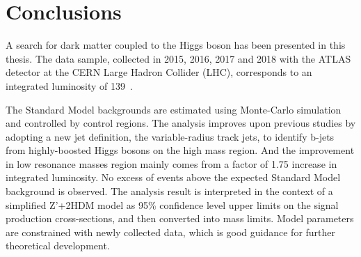 \chapter{Conclusions}

\label{ch:con}

\par A search for dark matter coupled to the Higgs boson has been presented in this thesis. 
The data sample, collected in 2015, 2016, 2017 and 2018 with the ATLAS detector at the CERN Large Hadron Collider (LHC), corresponds to an integrated luminosity of 139~\ifb. 

\par The Standard Model backgrounds are estimated using Monte-Carlo simulation and controlled by control regions. 
The analysis improves upon previous studies by adopting a new jet definition, the variable-radius track jets, to identify b-jets from highly-boosted Higgs bosons on the high mass region. 
And the improvement in low resonance masses region mainly comes from a factor of 1.75 increase in integrated luminosity. No excess of events above the expected Standard Model background is observed. 
The analysis result is interpreted in the context of a simplified Z'+2HDM model as 95\% confidence level upper limits on the signal production cross-sections, and then converted into mass limits. 
Model parameters are constrained with newly collected data, which is good guidance for further theoretical development.
